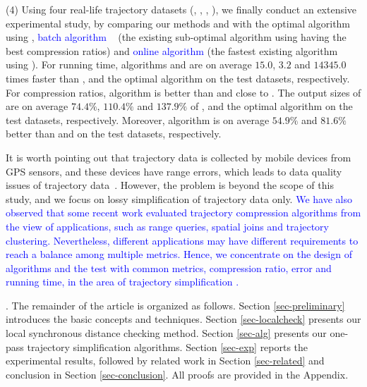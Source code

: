 \sstab (4) Using four real-life trajectory datasets (\sercar, \geolife, \mopsi, \pricar),
we finally conduct an extensive experimental study, by comparing our methods \cist and \cista  with the optimal \lsa algorithm using \sed, \textcolor{blue}{batch algorithm} \dps~\cite{Meratnia:Spatiotemporal} (the existing sub-optimal \lsa algorithm using \sed having the best compression ratios) and \textcolor{blue}{online algorithm} \squishe \cite{Muckell:Compression} (the fastest existing \lsa algorithm using \sed).
%
For running time, algorithms \cist and \cista are on average $15.0$, $3.2$ and $14345.0$ times faster than \dps, \squishe and the optimal \lsa algorithm on the test datasets, respectively.
%
For compression ratios, algorithm \cist is better than \squishe and close to \dps. The output sizes of \cist are on average $74.4\%$, $110.4\%$ and $137.9\%$ of \squishe, \dps and the optimal \lsa algorithm on the test datasets, respectively.
Moreover, algorithm \cista is on average $54.9\%$ and $81.6\%$ better than \squishe and \dps on the test datasets, respectively.

It is worth pointing out that trajectory data is collected by mobile devices from GPS sensors, and these devices have range errors, which leads to data quality issues of  trajectory data~\cite{PfoserJ99,ZufleTPRRLDE17}. However, the problem is beyond the scope of this study, and we focus on lossy simplification of trajectory data only.
%
\textcolor{blue}{We have also observed that some recent work \cite{Zhang:Evaluation} evaluated trajectory compression algorithms from the view of applications, such as range queries, spatial joins and trajectory clustering. Nevertheless, different applications may have different requirements to reach a balance among multiple metrics. Hence, we concentrate on the design of algorithms and the test with common metrics, \ie compression ratio, error and running time, in the area of trajectory simplification \cite{Meratnia:Spatiotemporal, Muckell:Compression, Chen:Trajectory, Cao:Spatio, Liu:BQS, Liu:Amnesic, Lin:Operb, Chen:Fast}.}

.
The remainder of the article is organized as follows.
Section \ref{sec-preliminary} introduces the basic concepts and techniques.
Section \ref{sec-localcheck} presents our local synchronous distance checking method.
Section \ref{sec-alg} presents our one-pass trajectory simplification algorithms.
Section \ref{sec-exp} reports the experimental results, followed by related work in
Section \ref{sec-related} and conclusion in Section \ref{sec-conclusion}.
All proofs are provided in the Appendix.





